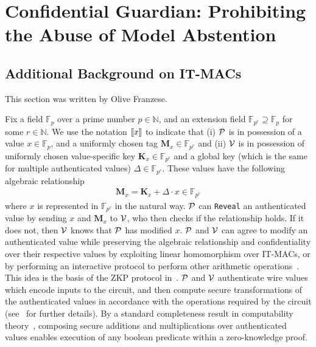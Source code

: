 \chapter{Confidential Guardian: Prohibiting the Abuse of Model Abstention}

\section{Additional Background on IT-MACs} \label{app:itmac}

\begin{contriback}
    This section was written by Olive Franzese.
\end{contriback}

Fix a field $\mathbb{F}_p$ over a prime number $p \in \mathbb{N}$, and an extension field $\mathbb{F}_{p^r} \supseteq \mathbb{F}_p$ for some $r \in \mathbb{N}$. We use the notation $\llbracket x \rrbracket$ to indicate that (i) $\mathcal{P}$ is in possession of a value $x \in \mathbb{F}_p$, and a uniformly chosen tag $\mathbf{M}_x \in \mathbb{F}_{p^r}$ and (ii) $\mathcal{V}$ is in possession of uniformly chosen value-specific key $\mathbf{K}_x \in \mathbb{F}_{p^r}$ and a global key (which is the same for multiple authenticated values) $\Delta \in \mathbb{F}_{p^r}$. These values have the following algebraic relationship
\begin{align*}
\mathbf{M}_x = \mathbf{K}_x + \Delta \cdot x \in \mathbb{F}_{p^r}
\end{align*}
where $x$ is represented in $\mathbb{F}_{p^r}$ in the natural way. $\mathcal{P}$ can \texttt{Reveal} an authenticated value by sending $x$ and $\mathbf{M}_x$ to $\mathcal{V}$, who then checks if the relationship holds. If it does not, then $\mathcal{V}$ knows that $\mathcal{P}$ has modified $x$. $\mathcal{P}$ and $\mathcal{V}$ can agree to modify an authenticated value while preserving the algebraic relationship and confidentiality over their respective values by exploiting linear homomorphism over IT-MACs, or by performing an interactive protocol to perform other arithmetic operations~\cite{damgaard2012itmac,nielsen2012itmac}. This idea is the basis of the ZKP protocol in~\cite{weng2021wolverine}. $\mathcal{P}$ and $\mathcal{V}$ authenticate wire values which encode inputs to the circuit, and then compute secure transformations of the authenticated values in accordance with the operations required by the circuit (see~\cite{weng2021wolverine} for further details). By a standard completeness result in computability theory~\cite{sipser1996introduction}, composing secure additions and multiplications over authenticated values enables execution of any boolean predicate within a zero-knowledge proof. 


